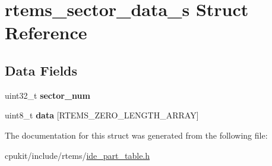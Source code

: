 \hypertarget{structrtems__sector__data__s}{}\section{rtems\+\_\+sector\+\_\+data\+\_\+s Struct Reference}
\label{structrtems__sector__data__s}
\subsection*{Data Fields}
\begin{DoxyCompactItemize}
\item 
\mbox{\label{structrtems__sector__data__s_a86ca00e319a794137508e59b73affa83}} 
uint32\+\_\+t {\bfseries sector\+\_\+num}
\item 
\mbox{\label{structrtems__sector__data__s_ad9e92bb01aa4b924e0e6b3031793394f}} 
uint8\+\_\+t {\bfseries data} \mbox{[}R\+T\+E\+M\+S\+\_\+\+Z\+E\+R\+O\+\_\+\+L\+E\+N\+G\+T\+H\+\_\+\+A\+R\+R\+AY\mbox{]}
\end{DoxyCompactItemize}


The documentation for this struct was generated from the following file\+:\begin{DoxyCompactItemize}
\item 
cpukit/include/rtems/\mbox{\hyperlink{ide__part__table_8h}{ide\+\_\+part\+\_\+table.\+h}}\end{DoxyCompactItemize}
